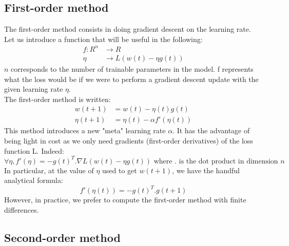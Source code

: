 \documentclass{article}
\begin{document}
  \subsection{First-order method}
  
  The first-order method consists in doing gradient descent on the learning rate.\\ 
  Let us introduce a function that will be useful in the following:\\
  \begin{align}
  f : R^{n} &\rightarrow R\\
  \eta &\rightarrow L(w(t)-\eta g(t))
  \end{align}
  $n$ corresponds to the number of trainable parameters in the model. f represents what the loss would be if we were to perform a gradient descent update with the given learning rate $\eta$.\\
  The first-order method is written:\\
  \begin{align}
  w(t+1) &= w(t) -\eta(t)g(t)\\
  \eta(t+1) &= \eta(t) - \alpha f'(\eta(t))
  \end{align} 
  This method introduces a new "meta" learning rate $\alpha$. It has the advantage of being light in cost as we only need gradients (first-order derivatives) of the loss function L. Indeed:\\
  \begin{equation}
  \forall \eta, f'(\eta) = -g(t)^{T}.\nabla L(w(t)-\eta g(t)) \text{ where . is the dot product in dimension $n$}
  \end{equation}
  In particular, at the value of $\eta$ used to get $w(t+1)$, we have the handful analytical formula:\\
  \begin{equation}
  f'(\eta(t)) = -g(t)^{T}.g(t+1)
  \end{equation}
  However, in practice, we prefer to compute the first-order method with finite differences.
  
  \subsection{Second-order method}
  
\end{document}
